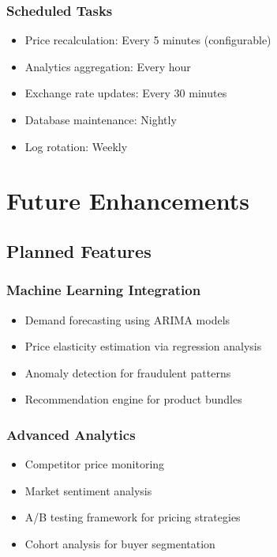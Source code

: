 \documentclass[12pt,a4paper,oneside]{report}
\begin{document}
\subsection{Scheduled Tasks}

\begin{itemize}
    \item Price recalculation: Every 5 minutes (configurable)
    \item Analytics aggregation: Every hour
    \item Exchange rate updates: Every 30 minutes
    \item Database maintenance: Nightly
    \item Log rotation: Weekly
\end{itemize}

\newpage

\chapter{Future Enhancements}

\section{Planned Features}

\subsection{Machine Learning Integration}

\begin{itemize}
    \item Demand forecasting using ARIMA models
    \item Price elasticity estimation via regression analysis
    \item Anomaly detection for fraudulent patterns
    \item Recommendation engine for product bundles
\end{itemize}

\subsection{Advanced Analytics}

\begin{itemize}
    \item Competitor price monitoring
    \item Market sentiment analysis
    \item A/B testing framework for pricing strategies
    \item Cohort analysis for buyer segmentation
\end{itemize}
\end{document}
